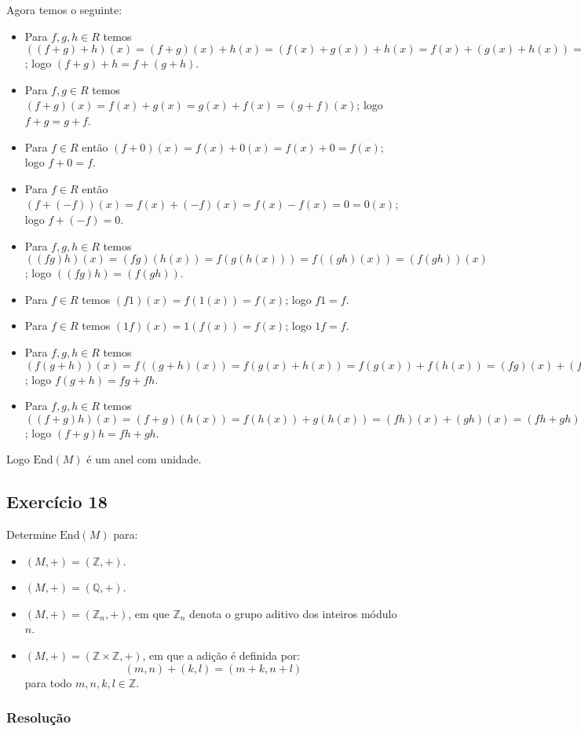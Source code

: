 \documentclass[10pt,a4paper]{article}
\begin{document}
\noindent
Agora temos o seguinte:
\begin{itemize}
\item Para $f,g,h\in R$ temos $((f+g)+h)(x)=(f+g)(x)+h(x)=(f(x)+g(x))+h(x)=f(x)+(g(x)+h(x))=f(x)+(g+h)(x)=(f+(g+h))(x)$; logo $(f+g)+h=f+(g+h)$.
\item Para $f,g\in R$ temos $(f+g)(x)=f(x)+g(x)=g(x)+f(x)=(g+f)(x)$; logo $f+g=g+f$.
\item Para $f\in R$ então $(f+0)(x)=f(x)+0(x)=f(x)+0=f(x)$; logo $f+0=f$.
\item Para $f\in R$ então $(f+(-f))(x)=f(x)+(-f)(x)=f(x)-f(x)=0=0(x)$; logo $f+(-f)=0$.
\item Para $f,g,h\in R$ temos $((fg)h)(x)=(fg)(h(x))=f(g(h(x)))=f((gh)(x))=(f(gh))(x)$; logo $((fg)h)=(f(gh))$.
\item Para $f\in R$ temos $(f1)(x)=f(1(x))=f(x)$; logo $f1=f$.
\item Para $f\in R$ temos $(1f)(x)=1(f(x))=f(x)$; logo $1f=f$.
\item Para $f,g,h\in R$ temos $(f(g+h))(x)=f((g+h)(x))=f(g(x)+h(x))=f(g(x))+f(h(x))=(fg)(x)+(fh)(x)=(fg+fh)(x)$; logo $f(g+h)=fg+fh$.
\item Para $f,g,h\in R$ temos $((f+g)h)(x)=(f+g)(h(x))=f(h(x))+g(h(x))=(fh)(x)+(gh)(x)=(fh+gh)(x)$; logo $(f+g)h=fh+gh$.
\end{itemize}
Logo $\mathrm{End}(M)$ é um anel com unidade.

\subsection*{Exercício 18}

Determine $\mathrm{End}(M)$ para:
\begin{itemize}
\item[a)] $(M,+)=(\mathbb{Z},+)$.
\item[b)] $(M,+)=(\mathbb{Q},+)$.
\item[c)] $(M,+)=(\mathbb{Z}_n,+)$, em que $\mathbb{Z}_n$ denota o grupo aditivo dos inteiros módulo $n$.
\item[d)] $(M,+)=(\mathbb{Z}\times\mathbb{Z},+)$, em que a adição é definida por:
\[
(m,n)+(k,l)=(m+k,n+l)
\]
para todo $m,n,k,l\in\mathbb{Z}$.
\end{itemize}

\subsubsection*{Resolução}
\end{document}
